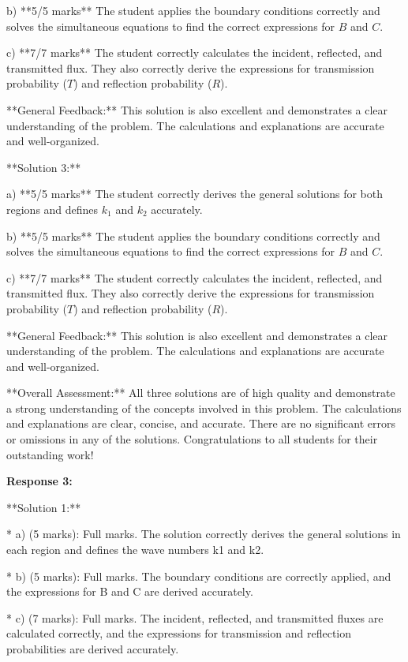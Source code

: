 \documentclass[a4paper,11pt]{article}
\begin{document}
b) **5/5 marks**
The student applies the boundary conditions correctly and solves the simultaneous equations to find the correct expressions for \(B\) and \(C\).

c) **7/7 marks**
The student correctly calculates the incident, reflected, and transmitted flux. They also correctly derive the expressions for transmission probability (\(T\)) and reflection probability (\(R\)).

**General Feedback:** This solution is also excellent and demonstrates a clear understanding of the problem. The calculations and explanations are accurate and well-organized.

**Solution 3:**

a) **5/5 marks**
The student correctly derives the general solutions for both regions and defines \(k_1\) and \(k_2\) accurately.

b) **5/5 marks**
The student applies the boundary conditions correctly and solves the simultaneous equations to find the correct expressions for \(B\) and \(C\).

c) **7/7 marks**
The student correctly calculates the incident, reflected, and transmitted flux. They also correctly derive the expressions for transmission probability (\(T\)) and reflection probability (\(R\)).

**General Feedback:** This solution is also excellent and demonstrates a clear understanding of the problem. The calculations and explanations are accurate and well-organized.

**Overall Assessment:** All three solutions are of high quality and demonstrate a strong understanding of the concepts involved in this problem. The calculations and explanations are clear, concise, and accurate. There are no significant errors or omissions in any of the solutions. Congratulations to all students for their outstanding work!

\textbf{Response 3:}

**Solution 1:**

* a) (5 marks): Full marks. The solution correctly derives the general solutions in each region and defines the wave numbers k1 and k2.

* b) (5 marks): Full marks. The boundary conditions are correctly applied, and the expressions for B and C are derived accurately.

* c) (7 marks): Full marks. The incident, reflected, and transmitted fluxes are calculated correctly, and the expressions for transmission and reflection probabilities are derived accurately.
\end{document}
